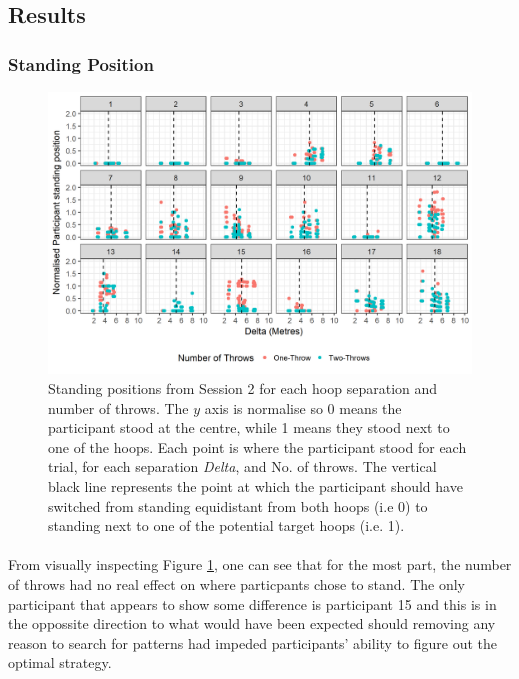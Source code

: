 \documentclass[12pt]{article}
\begin{document}
\subsection*{Results}
\subsubsection*{Standing Position}
\begin{figure}[ht!]
	\includegraphics[scale=0.9]{Figures/Experiment_2_Two_throw/Part2_BOTH_AvG_allpoints}
	\centering
	\captionsetup{justification=centering}
	\caption{Standing positions from Session 2 for each hoop separation and number of throws. The $y$ axis is normalise so 0 means the participant stood at the centre, while 1 means they stood next to one of the hoops. Each point is where the participant stood for each trial, for each separation \textit{Delta}, and No. of throws. The vertical black line represents the point at which the participant should have switched from standing equidistant from both hoops (i.e 0) to standing next to one of the potential target hoops (i.e. 1).}
	\label{fig:Session2-TwoThrows} 
\end{figure}

\paragraph{} From visually inspecting Figure \ref{fig:Session2-TwoThrows}, one can see that for the most part, the number of throws had no real effect on where particpants chose to stand. The only participant that appears to show some difference is participant 15 and this is in the oppossite direction to what would have been expected should removing any reason to search for patterns had impeded participants' ability to figure out the optimal strategy. 
\end{document}
